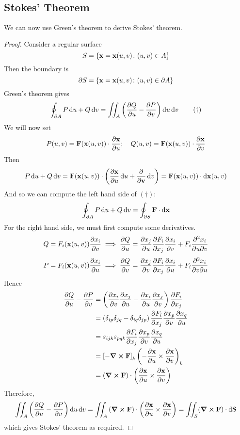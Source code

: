 \documentclass{article}
\begin{document}
\subsection{Stokes' Theorem}
We can now use Green's theorem to derive Stokes' theorem.
\begin{proof}
    Consider a regular surface
    \[ S = \left\{ \vb x = \vb x(u, v) \colon (u, v) \in A \right\} \]
    Then the boundary is
    \[ \partial S = \left\{ \vb x = \vb x(u, v) \colon (u, v) \in \partial A \right\} \]
    Green's theorem gives
    \begin{equation}
        \oint_{\partial A} P \dd{u} + Q \dd{v} = \iint_A \left( \pdv{Q}{u} - \pdv{P}{v} \right) \dd{u}\dd{v}
        \tag{$\dagger$}
    \end{equation}
    We will now set
    \[ P(u, v) = \vb F(\vb x(u, v)) \cdot \pdv{\vb x}{u};\quad Q(u, v) = \vb F(\vb x(u, v)) \cdot \pdv{\vb x}{v} \]
    Then
    \[ P \dd{u} + Q \dd{v} = \vb F(\vb x(u, v)) \cdot \left( \pdv{\vb x}{u} \dd{u} + \pdv{\vb v} \dd{v} \right) = \vb F(\vb x(u, v)) \cdot \dd{\vb x(u, v)} \]
    And so we can compute the left hand side of $(\dagger)$:
    \[ \oint_{\partial A} P \dd{u} + Q \dd{v} = \oint_{\partial S} \vb F \cdot \dd{\vb x} \]
    For the right hand side, we must first compute some derivatives.
    \[ Q = F_i(\vb x(u, v))\pdv{x_i}{v} \implies \pdv{Q}{u} = \pdv{x_j}{u}\pdv{F_i}{x_j}\pdv{x_i}{v} + F_i \pdv{x_i}{u}{v} \]
    \[ P = F_i(\vb x(u, v))\pdv{x_i}{u} \implies \pdv{Q}{v} = \pdv{x_j}{v}\pdv{F_i}{x_j}\pdv{x_i}{u} + F_i \pdv{x_i}{v}{u} \]
    Hence
    \begin{align*}
        \pdv{Q}{u} - \pdv{P}{v} & = \left( \pdv{x_i}{v}\pdv{x_j}{u} - \pdv{x_i}{u}\pdv{x_j}{v} \right) \pdv{F_i}{x_j}                       \\
                                & = \left( \delta_{ip} \delta_{jq} - \delta_{iq} \delta_{jp} \right) \pdv{F_i}{x_j}\pdv{x_p}{v}\pdv{x_q}{u} \\
                                & = \varepsilon_{ijk} \varepsilon_{pqk} \pdv{F_i}{x_j}\pdv{x_p}{v}\pdv{x_q}{u}                              \\
                                & = \left[ -\curl{\vb F} \right]_k \left( -\pdv{\vb x}{u} \times \pdv{\vb x}{v} \right)_k                   \\
                                & = \left( \curl{\vb F} \right) \cdot \left( \pdv{\vb x}{u} \times \pdv{\vb x}{v} \right)                   \\
    \end{align*}
    Therefore,
    \[ \iint_{A} \left( \pdv{Q}{u} - \pdv{P}{v} \right) \dd{u}\dd{v} = \iint_{A} \left( \curl{\vb F} \right) \cdot \left( \pdv{\vb x}{u} \times \pdv{\vb x}{v} \right) = \iint_{S} (\curl{\vb F}) \cdot \dd{\vb S} \]
    which gives Stokes' theorem as required.
\end{proof}
\end{document}
